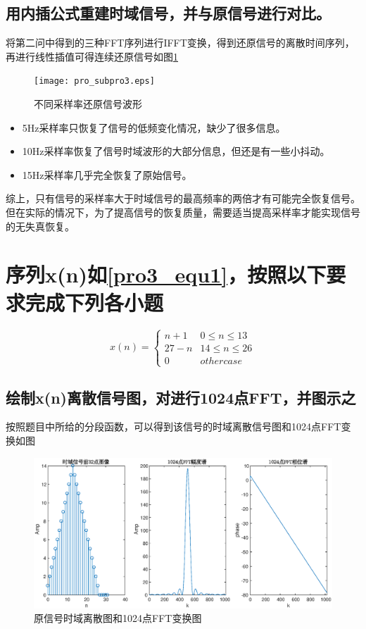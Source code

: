 \documentclass[UTF8]{article}
\begin{document}
\begin{CJK}{UTF8}{gkai}
\subsection{用内插公式重建时域信号，并与原信号进行对比。}
将第二问中得到的三种FFT序列进行IFFT变换，得到还原信号的离散时间序列，再进行线性插值可得连续还原信号如图\ref{pro2_fig3}
\begin{figure}
  \texttt{[image: pro\_subpro3.eps]}
  \caption{不同采样率还原信号波形}
  \label{pro2_fig3}
\end{figure}
\begin{itemize}
  \item 5Hz采样率只恢复了信号的低频变化情况，缺少了很多信息。
  \item 10Hz采样率恢复了信号时域波形的大部分信息，但还是有一些小抖动。
  \item 15Hz采样率几乎完全恢复了原始信号。
\end{itemize}
综上，只有信号的采样率大于时域信号的最高频率的两倍才有可能完全恢复信号。但在实际的情况下，为了提高信号的恢复质量，需要适当提高采样率才能实现信号的无失真恢复。

\section{序列x(n)如\ref{pro3_equ1}，按照以下要求完成下列各小题}
\begin{equation}
  x(n)=\left\{
  \begin{array}{cc}
    n+1 & 0\leq n\leq13\\
    27-n & 14\leq n\leq26\\
    0 & other case
  \end{array}
  \right.
  \label{pro3_equ1}
\end{equation}
\subsection{绘制x(n)离散信号图，对进行1024点FFT，并图示之}
按照题目中所给的分段函数，可以得到该信号的时域离散信号图和1024点FFT变换如图
\begin{figure}
  \includegraphics{pro3_subpro1.eps}
  \caption{原信号时域离散图和1024点FFT变换图}
  \label{pro3_fig1}
\end{figure}

\end{CJK}
\end{document}
